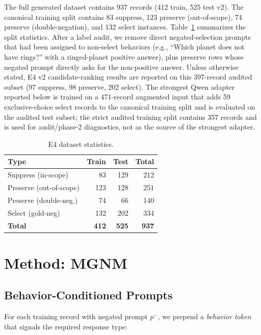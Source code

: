 \documentclass[letterpaper]{article}
\begin{document}
The full generated dataset contains 937 records (412 train, 525 test v2).
The canonical training split contains 83 suppress, 123 preserve
(out-of-scope), 74 preserve (double-negation), and 132 select instances.
Table~\ref{tab:dataset} summarizes the split statistics.
After a label audit, we remove direct negated-selection prompts that had been
assigned to non-select behaviors (e.g., ``Which planet does not have rings?''
with a ringed-planet positive answer), plus preserve rows whose negated prompt
directly asks for the non-positive answer. Unless otherwise stated, E4 v2
candidate-ranking results are reported on this 397-record audited subset
(97 suppress, 98 preserve, 202 select).
The strongest Qwen adapter reported below is trained on a 471-record augmented
input that adds 59 exclusive-choice select records to the canonical training
split and is evaluated on the audited test subset; the strict audited training
split contains 357 records and is used for audit/phase-2 diagnostics, not as
the source of the strongest adapter.

\begin{table}[t]
\centering
\small
\caption{E4 dataset statistics.}
\label{tab:dataset}
\begin{tabular}{lrrr}
\toprule
Type & Train & Test & Total \\
\midrule
Suppress (in-scope) & \phantom{0}83 & 129 & 212 \\
Preserve (out-of-scope) & 123 & 128 & 251 \\
Preserve (double-neg.) & \phantom{0}74 & \phantom{0}66 & 140 \\
Select (gold-neg) & 132 & 202 & 334 \\
\midrule
\textbf{Total} & \textbf{412} & \textbf{525} & \textbf{937} \\
\bottomrule
\end{tabular}
\end{table}

\section{Method: MGNM}
\label{sec:method}

\subsection{Behavior-Conditioned Prompts}

For each training record with negated prompt $p^-$, we prepend a
\emph{behavior token} that signals the required response type:
\end{document}
